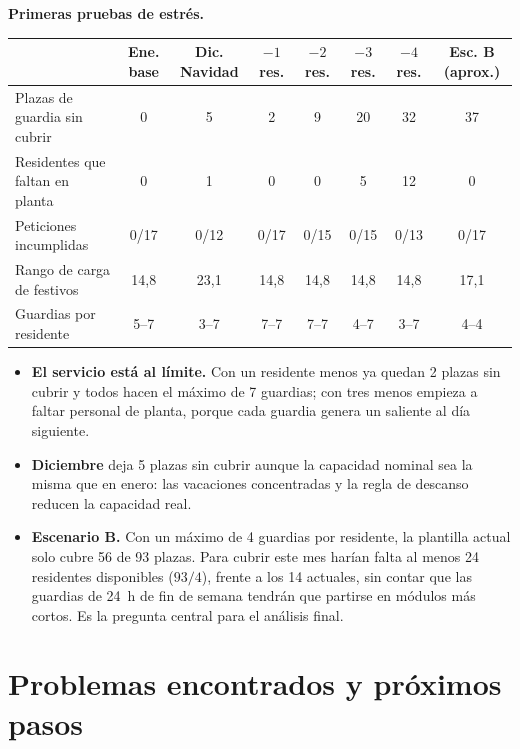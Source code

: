 \documentclass[10pt,a4paper]{article}
\begin{document}
\textbf{Primeras pruebas de estrés.}

\begin{center}\small
\begin{tabular}{@{}lccccccc@{}}
\toprule
 & Ene. base & Dic. Navidad & $-1$ res. & $-2$ res. & $-3$ res. & $-4$ res. & Esc. B (aprox.)\\
\midrule
Plazas de guardia sin cubrir & 0 & 5 & 2 & 9 & 20 & 32 & 37\\
Residentes que faltan en planta & 0 & 1 & 0 & 0 & 5 & 12 & 0\\
Peticiones incumplidas & 0/17 & 0/12 & 0/17 & 0/15 & 0/15 & 0/13 & 0/17\\
Rango de carga de festivos & 14,8 & 23,1 & 14,8 & 14,8 & 14,8 & 14,8 & 17,1\\
Guardias por residente & 5--7 & 3--7 & 7--7 & 7--7 & 4--7 & 3--7 & 4--4\\
\bottomrule
\end{tabular}
\end{center}

\begin{itemize}
  \item \textbf{El servicio está al límite.} Con un residente menos ya quedan 2 plazas sin cubrir y todos hacen el máximo de 7 guardias; con tres menos empieza a faltar personal de planta, porque cada guardia genera un saliente al día siguiente.
  \item \textbf{Diciembre} deja 5 plazas sin cubrir aunque la capacidad nominal sea la misma que en enero: las vacaciones concentradas y la regla de descanso reducen la capacidad real.
  \item \textbf{Escenario B.} Con un máximo de 4 guardias por residente, la plantilla actual solo cubre 56 de 93 plazas. Para cubrir este mes harían falta al menos 24 residentes disponibles ($93/4$), frente a los 14 actuales, sin contar que las guardias de 24~h de fin de semana tendrán que partirse en módulos más cortos. Es la pregunta central para el análisis final.
\end{itemize}

\section{Problemas encontrados y próximos pasos}
\end{document}
